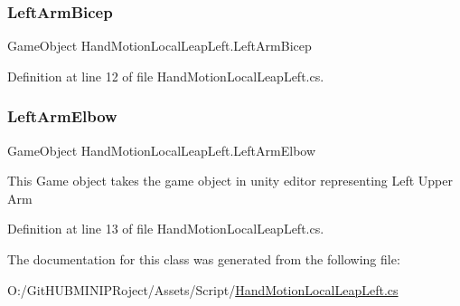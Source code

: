 \subsubsection{\texorpdfstring{LeftArmBicep}{LeftArmBicep}}
{\footnotesize\ttfamily Game\+Object Hand\+Motion\+Local\+Leap\+Left.\+Left\+Arm\+Bicep}



Definition at line 12 of file Hand\+Motion\+Local\+Leap\+Left.\+cs.

\mbox{\label{class_hand_motion_local_leap_left_a61131895af083c1d9c38f9fb5abf5316}} 
\subsubsection{\texorpdfstring{LeftArmElbow}{LeftArmElbow}}
{\footnotesize\ttfamily Game\+Object Hand\+Motion\+Local\+Leap\+Left.\+Left\+Arm\+Elbow}

This Game object takes the game object in unity editor representing Left Upper Arm 

Definition at line 13 of file Hand\+Motion\+Local\+Leap\+Left.\+cs.



The documentation for this class was generated from the following file\+:\begin{DoxyCompactItemize}
\item 
O\+:/\+Git\+H\+U\+B\+M\+I\+N\+I\+P\+Roject/\+Assets/\+Script/\mbox{\hyperlink{_hand_motion_local_leap_left_8cs}{Hand\+Motion\+Local\+Leap\+Left.\+cs}}\end{DoxyCompactItemize}
